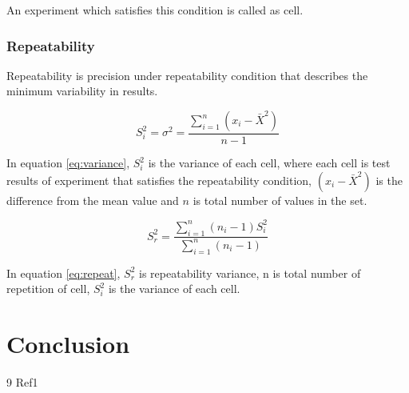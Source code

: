 \documentclass[11pt,a4paper,headinclude,footinclude,chapterprefix=on]{scrreprt}
\begin{document}
An experiment which satisfies this condition is called as cell. 

\subsection{Repeatability}
Repeatability is precision under repeatability condition that describes the minimum variability in results.

\begin{equation}\label{eq:variance}
{S}_i^2 = {\sigma}^2 =  \frac{\sum\limits_{i=1}^{n} (x_{i} - \bar{X}^2)}{n-1}
\end{equation}

In equation \ref{eq:variance},
 $S_{i}^{2}$ is the variance of each cell, where each cell is test results of experiment that satisfies the repeatability condition, $(x_{i} - \bar{X}^2)$ is the difference from the mean value and $n$ is total number of values in the set.

\begin{equation}\label{eq:repeat}
{S}_r^2 = \frac{\sum\limits_{i=1}^{n} (n_{i} - 1){S}_i^2}
{\sum\limits_{i=1}^{n}(n_{i} - 1)}
\end{equation}

In equation \ref{eq:repeat},
${S}_r^2$ is repeatability variance, n is total number of repetition of cell, $S_{i}^{2}$ is the variance of each cell. 


\chapter{Conclusion}

\pagebreak 

\begin{thebibliography}
	{9}  Ref1 
\end{thebibliography}
\end{document}
